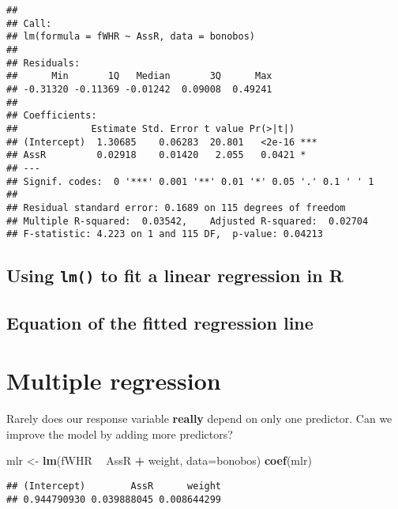 \documentclass[]{book}
\newenvironment{Shaded}{\begin{snugshade}}{\end{snugshade}}
\newcommand{\DataTypeTok}[1]{\textcolor[rgb]{0.13,0.29,0.53}{#1}}
\newcommand{\KeywordTok}[1]{\textcolor[rgb]{0.13,0.29,0.53}{\textbf{#1}}}
\newcommand{\NormalTok}[1]{#1}
\newcommand{\OperatorTok}[1]{\textcolor[rgb]{0.81,0.36,0.00}{\textbf{#1}}}
\newcommand{\StringTok}[1]{\textcolor[rgb]{0.31,0.60,0.02}{#1}}
\begin{document}
\begin{verbatim}
## 
## Call:
## lm(formula = fWHR ~ AssR, data = bonobos)
## 
## Residuals:
##      Min       1Q   Median       3Q      Max 
## -0.31320 -0.11369 -0.01242  0.09008  0.49241 
## 
## Coefficients:
##             Estimate Std. Error t value Pr(>|t|)    
## (Intercept)  1.30685    0.06283  20.801   <2e-16 ***
## AssR         0.02918    0.01420   2.055   0.0421 *  
## ---
## Signif. codes:  0 '***' 0.001 '**' 0.01 '*' 0.05 '.' 0.1 ' ' 1
## 
## Residual standard error: 0.1689 on 115 degrees of freedom
## Multiple R-squared:  0.03542,    Adjusted R-squared:  0.02704 
## F-statistic: 4.223 on 1 and 115 DF,  p-value: 0.04213
\end{verbatim}

\hypertarget{using-lm-to-fit-a-linear-regression-in-r}{%
\subsection{\texorpdfstring{Using \texttt{lm()} to fit a linear regression in R}{Using lm() to fit a linear regression in R}}\label{using-lm-to-fit-a-linear-regression-in-r}}

\hypertarget{equation-of-the-fitted-regression-line}{%
\subsection{Equation of the fitted regression line}\label{equation-of-the-fitted-regression-line}}

\hypertarget{multiple-regression}{%
\section{Multiple regression}\label{multiple-regression}}

Rarely does our response variable \textbf{really} depend on only one predictor. Can we improve the model by adding more predictors?

\begin{Shaded}
\begin{Highlighting}[]
\NormalTok{mlr <-}\StringTok{ }\KeywordTok{lm}\NormalTok{(fWHR }\OperatorTok{~}\StringTok{ }\NormalTok{AssR }\OperatorTok{+}\StringTok{ }\NormalTok{weight, }\DataTypeTok{data=}\NormalTok{bonobos)}
\KeywordTok{coef}\NormalTok{(mlr)}
\end{Highlighting}
\end{Shaded}

\begin{verbatim}
## (Intercept)        AssR      weight 
## 0.944790930 0.039888045 0.008644299
\end{verbatim}
\end{document}
